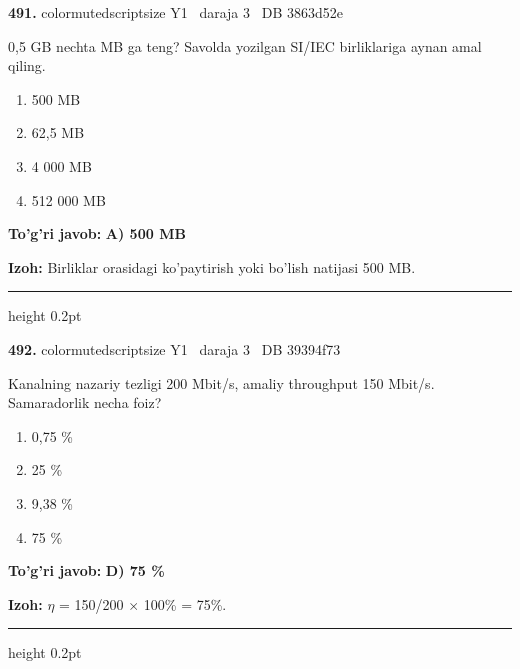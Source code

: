 \documentclass[10pt,a4paper,oneside]{article}
\begin{document}
\noindent\textbf{\color{ink}491.}  {color{muted}scriptsize Y1 \textbullet\ daraja 3 \textbullet\ DB 3863d52e}
\par
0,5 GB nechta MB ga teng? Savolda yozilgan SI/IEC birliklariga aynan amal qiling.
\begin{enumerate}[label=\Alph*),leftmargin=9mm]
\item 500 MB
\item 62,5 MB
\item 4 000 MB
\item 512 000 MB
\end{enumerate}
\begin{tcolorbox}[enhanced,breakable,colback=teal!4,colframe=teal!50!black,boxrule=0.5pt,arc=1.1mm,left=3mm,right=3mm,top=1.7mm,bottom=1.7mm,before skip=2mm,after skip=2mm]
\textbf{\color{teal}To'g'ri javob:} \textbf{A) 500 MB}
\par\smallskip
\textbf{Izoh:} Birliklar orasidagi ko'paytirish yoki bo'lish natijasi 500 MB.
\end{tcolorbox}
\vspace{2mm}\hrule height 0.2pt \vspace{3mm}

\noindent\textbf{\color{ink}492.}  {color{muted}scriptsize Y1 \textbullet\ daraja 3 \textbullet\ DB 39394f73}
\par
Kanalning nazariy tezligi 200 Mbit/s, amaliy throughput 150 Mbit/s. Samaradorlik necha foiz?
\begin{enumerate}[label=\Alph*),leftmargin=9mm]
\item 0,75 \%
\item 25 \%
\item 9,38 \%
\item 75 \%
\end{enumerate}
\begin{tcolorbox}[enhanced,breakable,colback=teal!4,colframe=teal!50!black,boxrule=0.5pt,arc=1.1mm,left=3mm,right=3mm,top=1.7mm,bottom=1.7mm,before skip=2mm,after skip=2mm]
\textbf{\color{teal}To'g'ri javob:} \textbf{D) 75 \%}
\par\smallskip
\textbf{Izoh:} \ensuremath{\eta} = 150/200 \ensuremath{\times} 100\% = 75\%.
\end{tcolorbox}
\vspace{2mm}\hrule height 0.2pt \vspace{3mm}
\end{document}

